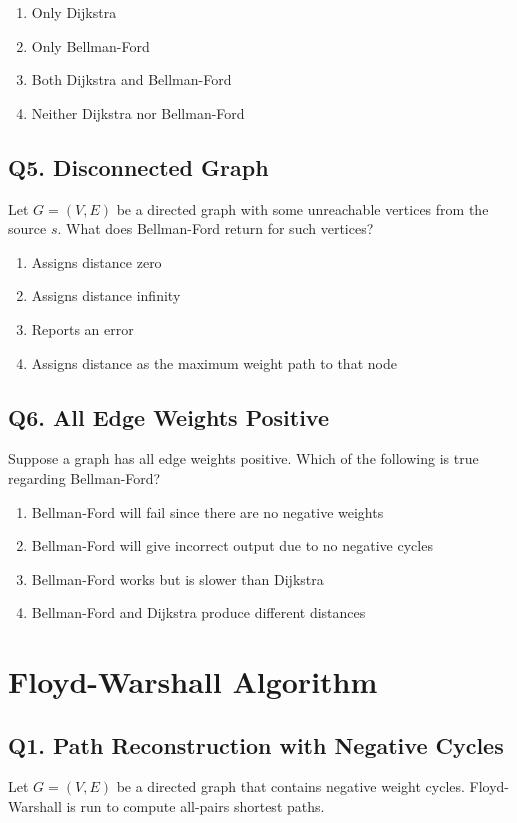 \begin{enumerate}[label=(\alph*)]
    \item Only Dijkstra
    \item Only Bellman-Ford
    \item Both Dijkstra and Bellman-Ford
    \item Neither Dijkstra nor Bellman-Ford
\end{enumerate}

\subsection*{Q5. Disconnected Graph}
Let $G = (V, E)$ be a directed graph with some unreachable vertices from the source $s$. What does Bellman-Ford return for such vertices?

\begin{enumerate}[label=(\alph*)]
    \item Assigns distance zero
    \item Assigns distance infinity
    \item Reports an error
    \item Assigns distance as the maximum weight path to that node
\end{enumerate}

\subsection*{Q6. All Edge Weights Positive}
Suppose a graph has all edge weights positive. Which of the following is true regarding Bellman-Ford?

\begin{enumerate}[label=(\alph*)]
    \item Bellman-Ford will fail since there are no negative weights
    \item Bellman-Ford will give incorrect output due to no negative cycles
    \item Bellman-Ford works but is slower than Dijkstra
    \item Bellman-Ford and Dijkstra produce different distances
\end{enumerate}

\section{Floyd-Warshall Algorithm}
\subsection*{Q1. Path Reconstruction with Negative Cycles}
Let $G = (V, E)$ be a directed graph that contains negative weight cycles. Floyd-Warshall is run to compute all-pairs shortest paths.


